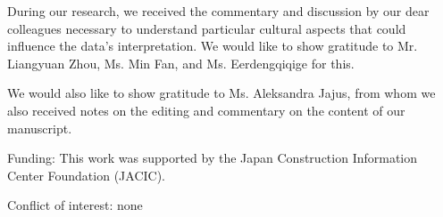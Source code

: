 \documentclass[smallextended,natbib]{svjour3}       %
\begin{document}
\begin{acknowledgements}

  During our research, we received the commentary and discussion by our dear colleagues necessary to understand particular cultural aspects that could influence the data's interpretation. We would like to show gratitude to Mr. Liangyuan Zhou, Ms. Min Fan, and Ms. Eerdengqiqige for this.

  We would also like to show gratitude to Ms. Aleksandra Jajus, from whom we also received notes on the editing and commentary on the content of our manuscript.

  \medskip

  Funding: This work was supported by the Japan Construction Information Center Foundation (JACIC).

  \medskip

  Conflict of interest: none

\end{acknowledgements}



\end{document}
